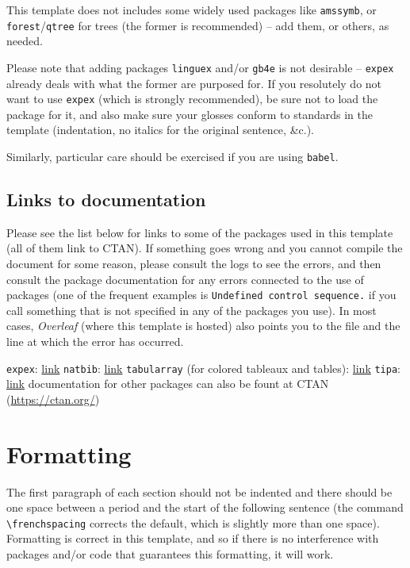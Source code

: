 This template does not includes some widely used packages like \verb=amssymb=, or \verb=forest=/\verb=qtree= for trees (the former is recommended) -- add them, or others, as needed.

Please note that adding packages \verb=linguex= and/or \verb=gb4e= is not desirable -- \verb=expex= already deals with what the former are purposed for. If you resolutely do not want to use \verb=expex= (which is strongly recommended), be sure not to load the package for it, and also make sure your glosses conform to standards in the template (indentation, no italics for the original sentence, \&c.).

Similarly, particular care should be exercised if you are using \verb=babel=.

\subsection{Links to documentation}
Please see the list below for links to some of the packages used in this template (all of them link to CTAN). If something goes wrong and you cannot compile the document for some reason, please consult the logs to see the errors, and then consult the package documentation for any errors connected to the use of packages (one of the frequent examples is \verb=Undefined control sequence.= if you call something that is not specified in any of the packages you use). In most cases, \textit{Overleaf} (where this template is hosted) also points you to the file and the line at which the error has occurred.

\pex
\a \verb=expex=: \href{https://ctan.org/pkg/expex?lang=en}{link}
\a \verb=natbib=: \href{https://ctan.org/pkg/natbib?lang=en}{link}
\a \verb=tabularray= (for colored tableaux and tables): \href{https://ctan.org/pkg/tabularray}{link}
\a \verb=tipa=: \href{https://ctan.org/pkg/tipa?lang=en}{link}
\a documentation for other packages can also be fount at CTAN (\href{https://ctan.org/}{https://ctan.org/})
\xe

\section{Formatting}
The first paragraph of each section should not be indented and there should be one space between a period and the start of the following sentence (the command \verb=\frenchspacing= corrects the default, which is slightly more than one space). Formatting is correct in this template, and so if there is no interference with packages and/or code that guarantees this formatting, it will work.

